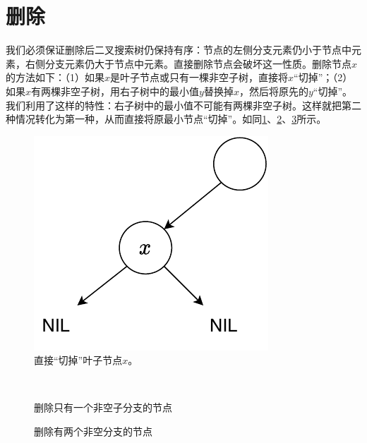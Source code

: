 \documentclass[b5paper]{ctexart}
\begin{document}
\section{删除}
我们必须保证删除后二叉搜索树仍保持有序：节点的左侧分支元素仍小于节点中元素，右侧分支元素仍大于节点中元素。直接删除节点会破坏这一性质。删除节点$x$的方法如下\cite{sgi-stl}：（1）如果$x$是叶子节点或只有一棵非空子树，直接将$x$“切掉”；（2）如果$x$有两棵非空子树，用右子树中的最小值$y$替换掉$x$，然后将原先的$y$“切掉”。我们利用了这样的特性：右子树中的最小值不可能有两棵非空子树。这样就把第二种情况转化为第一种，从而直接将原最小节点“切掉”。如同\cref{fig:del-leaf}、\cref{fig:del-1child}、\cref{fig:del-branch}所示。

\begin{figure}[htbp]
  \centering
  \includegraphics[scale=0.5]{img/del-leaf}
  \caption{直接“切掉”叶子节点$x$。}
  \label{fig:del-leaf}
\end{figure}

\begin{figure}[htbp]
  \centering
   \\
  \caption{删除只有一个非空子分支的节点}
  \label{fig:del-1child}
\end{figure}

\begin{figure}[htbp]
  \centering
  \caption{删除有两个非空分支的节点}
  \label{fig:del-branch}
\end{figure}
\end{document}
